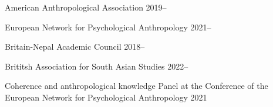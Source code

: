 


\begin{cvmemberships}
  \cvmembership
    {American Anthropological Association} %
    {2019--} %

  \cvmembership
    {European Network for Psychological Anthropology} %
    {2021--} %

\end{cvmemberships}

\begin{cvmemberships}
  \cvmembership
    {Britain-Nepal Academic Council} %
    {2018--} %

  \cvmembership
    {Brititsh Association for South Asian Studies} %
    {2022--} %
\end{cvmemberships}


\begin{cvexperiences}

  \cvexperience
    {Coherence and anthropological knowledge} %
    {Panel at the Conference of the European Network for Psychological Anthropology} %
    {2021} %

\end{cvexperiences}
